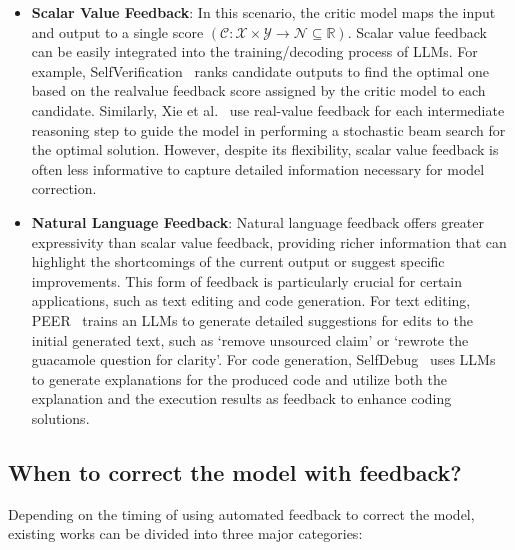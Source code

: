 \documentclass[a4paper,oneside]{book}
\begin{document}
\begin{itemize}
    \item \textbf{Scalar Value Feedback}: In this scenario, the critic model maps the input and output to a single score $(\mathcal{C}: \mathcal{X} \times \mathcal{Y} \rightarrow \mathcal{N} \subseteq \mathbb{R})$. Scalar value feedback can be easily integrated into the training/decoding process of LLMs. For example, SelfVerification~\cite{weng2023large} ranks candidate outputs to find the optimal one based on the realvalue feedback score assigned by the critic model to each candidate. Similarly, Xie et al.~\cite{xie2023selfevaluation} use real-value feedback for each intermediate reasoning step to guide the model in performing a stochastic beam search for the optimal solution. However, despite its flexibility, scalar value feedback is often less informative to capture detailed information necessary for model correction.

    \item \textbf{Natural Language Feedback}: Natural language feedback offers greater expressivity than scalar value feedback, providing richer information that can highlight the shortcomings of the current output or suggest specific improvements. This form of feedback is particularly crucial for certain applications, such as text editing and code generation. For text editing, PEER~\cite{schick2022peer} trains an LLMs to generate detailed suggestions for edits to the initial generated text, such as `remove unsourced claim' or `rewrote the guacamole question for clarity'. For code generation, SelfDebug~\cite{chen2023teaching} uses LLMs to generate explanations for the produced code and utilize both the explanation and the execution results as feedback to enhance coding solutions.
\end{itemize}

\subsection{When to correct the model with feedback?}
Depending on the timing of using automated feedback to correct the model, existing works can be divided into three major categories:
\end{document}

